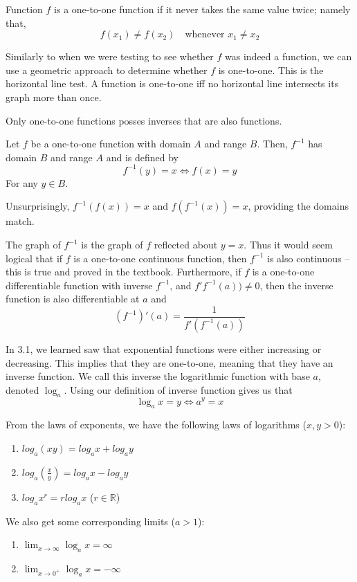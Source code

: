\documentclass[10pt,a4paper]{report}
\begin{document}
Function $f$ is a one-to-one function if it never takes the same value twice; namely that,
$$
	f(x_1) \ne f(x_2) \quad \text{whenever } x_1 \ne x_2
$$

Similarly to when we were testing to see whether $f$ was indeed a function, we can use a geometric approach to determine whether $f$ is one-to-one. This is the horizontal line test. A function is one-to-one iff no horizontal line intersects its graph more than once.

Only one-to-one functions posses inverses that are also functions.

Let $f$ be a one-to-one function with domain $A$ and range $B$. Then, $f^{-1}$ has domain $B$ and range $A$ and is defined by
$$
	f^{-1}(y) = x \iff f(x) = y
$$
For any $y \in B$.

Unsurprisingly, $f^{-1}(f(x)) = x$ and $f(f^{-1}(x)) = x$, providing the domains match.

The graph of $f^{-1}$ is the graph of $f$ reflected about $y = x$. Thus it would seem logical that if $f$ is a one-to-one continuous function, then $f^{-1}$ is also continuous -- this is true and proved in the textbook. Furthermore, if $f$ is a one-to-one differentiable function with inverse $f^{-1}$, and $f'f^{-1}(a)) \ne 0$, then the inverse function is also differentiable at $a$ and
$$
	(f^{-1})'(a) = \frac{1}{f'(f^{-1}(a))}
$$

In 3.1, we learned saw that exponential functions were either increasing or decreasing. This implies that they are one-to-one, meaning that they have an inverse function. We call this inverse the logarithmic function with base $a$, denoted $\log_a$. Using our definition of inverse function gives us that
$$
	\log_a x = y \iff a^y = x
$$

From the laws of exponents, we have the following laws of logarithms ($x, y > 0$):

\begin{enumerate}
	\item $log_a (xy) = log_a x + log_a y$
	\item $log_a (\frac{x}{y}) = log_a x - log_a y$
	\item $log_a x^r = rlog_a x$ ($r \in \mathbb{R}$)
\end{enumerate}

We also get some corresponding limits ($a > 1$):
\begin{enumerate}
	\item $\lim_{x \to \infty} \log_a x = \infty$
	\item $\lim_{x \to 0^+} \log_a x = -\infty$
\end{enumerate}
\end{document}
